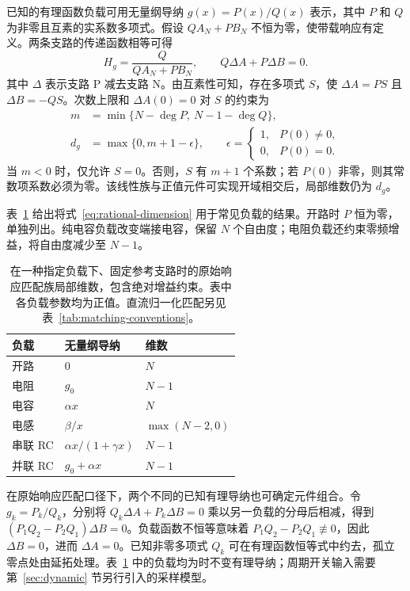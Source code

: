 已知的有理函数负载可用无量纲导纳 $g(x)=P(x)/Q(x)$ 表示，其中 $P$ 和 $Q$ 为非零且互素的实系数多项式。假设 $QA_N+PB_N$ 不恒为零，使带载响应有定义。两条支路的传递函数相等可得
\begin{equation}\label{eq:rational-kernel}
H_g=\frac{Q}{QA_N+PB_N},\qquad
Q\Delta A+P\Delta B=0.
\end{equation}
其中 $\Delta$ 表示支路 P 减去支路 N。由互素性可知，存在多项式 $S$，使 $\Delta A=PS$ 且 $\Delta B=-QS$。次数上限和 $\Delta A(0)=0$ 对 $S$ 的约束为
\begin{equation}\label{eq:rational-dimension}
\begin{aligned}
m&=\min\{N-\deg P,\ N-1-\deg Q\},\\
d_g&=\max\{0,m+1-\epsilon\},\qquad
\epsilon=\begin{cases}1,&P(0)\ne0,\\0,&P(0)=0.\end{cases}
\end{aligned}
\end{equation}
当 $m<0$ 时，仅允许 $S=0$。否则，$S$ 有 $m+1$ 个系数；若 $P(0)$ 非零，则其常数项系数必须为零。该线性族与正值元件可实现开域相交后，局部维数仍为 $d_g$。

表~\ref{tab:load-dimensions} 给出将式~\eqref{eq:rational-dimension} 用于常见负载的结果。开路时 $P$ 恒为零，单独列出。纯电容负载改变端接电容，保留 $N$ 个自由度；电阻负载还约束零频增益，将自由度减少至 $N-1$。
\begin{table}[htbp]
\centering
\caption{在一种指定负载下、固定参考支路时的原始响应匹配族局部维数，包含绝对增益约束。表中各负载参数均为正值。直流归一化匹配另见表~\ref{tab:matching-conventions}。}
\label{tab:load-dimensions}
\begin{tabular}{lll}
\toprule
负载 & 无量纲导纳 & 维数 \\
\midrule
开路 & $0$ & $N$ \\
电阻 & $g_0$ & $N-1$ \\
电容 & $\alpha x$ & $N$ \\
电感 & $\beta/x$ & $\max(N-2,0)$ \\
串联 RC & $\alpha x/(1+\gamma x)$ & $N-1$ \\
并联 RC & $g_0+\alpha x$ & $N-1$ \\
\bottomrule
\end{tabular}
\end{table}

在原始响应匹配口径下，两个不同的已知有理导纳也可确定元件组合。令 $g_k=P_k/Q_k$，分别将 $Q_k\Delta A+P_k\Delta B=0$ 乘以另一负载的分母后相减，得到 $(P_1Q_2-P_2Q_1)\Delta B=0$。负载函数不恒等意味着 $P_1Q_2-P_2Q_1\not\equiv0$，因此 $\Delta B=0$，进而 $\Delta A=0$。已知非零多项式 $Q_k$ 可在有理函数恒等式中约去，孤立零点处由延拓处理。表~\ref{tab:load-dimensions} 中的负载均为时不变有理导纳；周期开关输入需要第~\ref{sec:dynamic} 节另行引入的采样模型。

